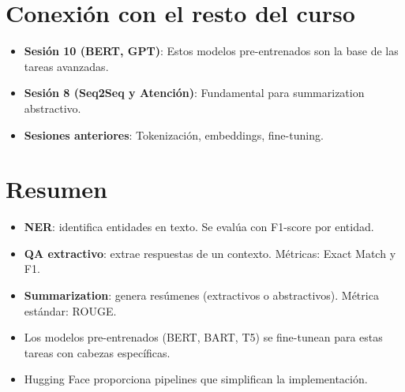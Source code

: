 \documentclass[12pt,a4paper,openany,oneside]{book}
\begin{document}
\section{Conexión con el resto del curso}
\begin{itemize}
    \item \textbf{Sesión 10 (BERT, GPT)}: Estos modelos pre-entrenados son la base de las tareas avanzadas.
    \item \textbf{Sesión 8 (Seq2Seq y Atención)}: Fundamental para summarization abstractivo.
    \item \textbf{Sesiones anteriores}: Tokenización, embeddings, fine-tuning.
\end{itemize}

\section{Resumen}
\begin{itemize}
    \item \textbf{NER}: identifica entidades en texto. Se evalúa con F1-score por entidad.
    \item \textbf{QA extractivo}: extrae respuestas de un contexto. Métricas: Exact Match y F1.
    \item \textbf{Summarization}: genera resúmenes (extractivos o abstractivos). Métrica estándar: ROUGE.
    \item Los modelos pre-entrenados (BERT, BART, T5) se fine-tunean para estas tareas con cabezas específicas.
    \item Hugging Face proporciona pipelines que simplifican la implementación.
\end{itemize}
\end{document}
